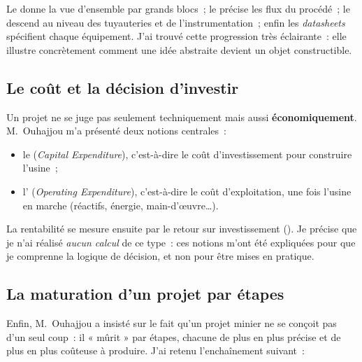 Le  donne la vue d'ensemble par grands blocs~; le  précise les flux du procédé~; le  descend au niveau des tuyauteries et de l'instrumentation~; enfin les \textit{datasheets} spécifient chaque équipement. J'ai trouvé cette progression très éclairante~: elle illustre concrètement comment une idée abstraite devient un objet constructible.

\subsection{Le coût et la décision d'investir}

Un projet ne se juge pas seulement techniquement mais aussi \textbf{économiquement}. M.~Ouhajjou m'a présenté deux notions centrales~:

\begin{itemize}
\item le  (\textit{Capital Expenditure}), c'est-à-dire le coût d'investissement pour construire l'usine~;
\item l' (\textit{Operating Expenditure}), c'est-à-dire le coût d'exploitation, une fois l'usine en marche (réactifs, énergie, main-d'œuvre\ldots).
\end{itemize}

La rentabilité se mesure ensuite par le retour sur investissement (). Je précise que je n'ai réalisé \emph{aucun calcul} de ce type~: ces notions m'ont été expliquées pour que je comprenne la logique de décision, et non pour être mises en pratique.

\subsection{La maturation d'un projet par étapes}

Enfin, M.~Ouhajjou a insisté sur le fait qu'un projet minier ne se conçoit pas d'un seul coup~: il « mûrit » par étapes, chacune de plus en plus précise et de plus en plus coûteuse à produire. J'ai retenu l'enchaînement suivant~:

